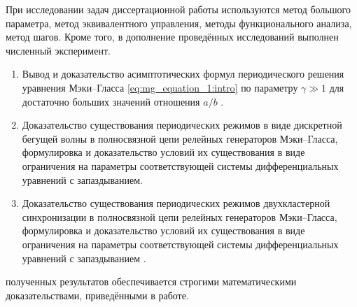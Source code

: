 {\methods} При исследовании задач диссертационной работы используются метод большого параметра, метод эквивалентного управления, методы функционального анализа, метод шагов. Кроме того, в дополнение проведённых исследований выполнен численный эксперимент.

{}
\begin{enumerate}[beginpenalty=10000] %
  \item Вывод и доказательство асимптотических формул периодического решения уравнения Мэки--Гласса \eqref{eq:mg_equation_1:intro} по параметру $\gamma \gg 1$ для достаточно больших значений отношения $a / b$ \cite{wosbib1}. %
  \item Доказательство существования периодических режимов в виде дискретной бегущей волны в полносвязной цепи релейных генераторов Мэки--Гласса, формулировка и доказательство условий их существования в виде ограничения на параметры соответствующей системы дифференциальных уравнений с запаздыванием.
  \item Доказательство существования периодических режимов двухкластерной синхронизации в полносвязной цепи релейных генераторов Мэки--Гласса, формулировка и доказательство условий их существования в виде ограничения на параметры соответствующей системы дифференциальных уравнений с запаздыванием \cite{scbib1}.
\end{enumerate}


{\reliability} полученных результатов обеспечивается строгими математическими доказательствами, приведёнными в работе. %

\nocite{scbib1, wosbib1, wosbib2}


